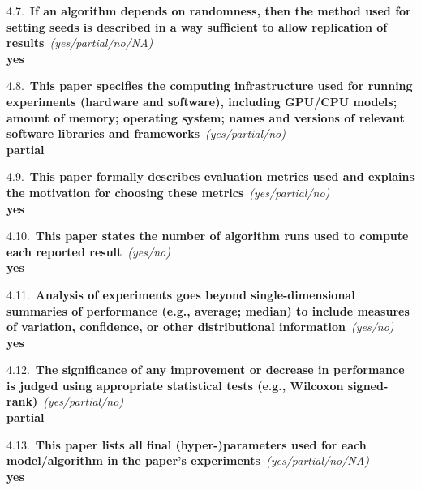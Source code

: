 \documentclass[letterpaper]{article}
\newcommand{\question}[2]{\vspace{6pt}\noindent\textbf{#1}~\textit{#2}\\}
\newcommand{\answer}[1]{\textbf{#1}}
\begin{document}
4.7.~\question{If an algorithm depends on randomness, then the method used for
setting seeds is described in a way sufficient to allow replication of
results}{(yes/partial/no/NA)}
\answer{yes}

4.8.~\question{This paper specifies the computing infrastructure used for running
experiments (hardware and software), including GPU/CPU models; amount of memory;
operating system; names and versions of relevant software libraries and
frameworks}{(yes/partial/no)}
\answer{partial}

4.9.~\question{This paper formally describes evaluation metrics used and explains
the motivation for choosing these metrics}{(yes/partial/no)}
\answer{yes}

4.10.~\question{This paper states the number of algorithm runs used to compute
each reported result}{(yes/no)}
\answer{yes}

4.11.~\question{Analysis of experiments goes beyond single-dimensional summaries
of performance (e.g., average; median) to include measures of variation,
confidence, or other distributional information}{(yes/no)}
\answer{yes}

4.12.~\question{The significance of any improvement or decrease in performance is
judged using appropriate statistical tests (e.g., Wilcoxon
signed-rank)}{(yes/partial/no)}
\answer{partial}

4.13.~\question{This paper lists all final (hyper-)parameters used for each
model/algorithm in the paper's experiments}{(yes/partial/no/NA)}
\answer{yes}
\end{document}
